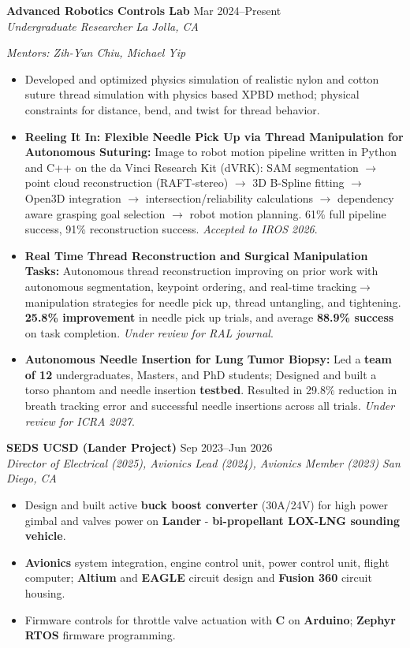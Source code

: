 \documentclass[11pt,a4paper]{article}
\newcommand{\resumeHeading}[4]{
  \vspace{0.15cm}
  \noindent\textbf{#1} \hfill #2 \\
  \noindent\textit{#3} \hfill \textit{#4} \par\vspace{0.1cm}
}
\begin{document}
\resumeHeading{Advanced Robotics Controls Lab}{Mar 2024--Present}{Undergraduate Researcher}{La Jolla, CA}
\vspace{-0.1cm}
\textit{\small Mentors: Zih-Yun Chiu, Michael Yip}
\begin{itemize}[leftmargin=0.2in, itemsep=2pt, parsep=0pt, topsep=4pt]
    \item Developed and optimized physics simulation of realistic nylon and cotton suture thread simulation with physics based XPBD method; physical constraints for distance, bend, and twist for thread behavior.
    \item \textbf{Reeling It In: Flexible Needle Pick Up via Thread Manipulation for Autonomous Suturing:} Image to robot motion pipeline written in Python and C++ on the da Vinci Research Kit (dVRK): SAM segmentation $\rightarrow$ point cloud reconstruction (RAFT-stereo) $\rightarrow$ 3D B-Spline fitting $\rightarrow$ Open3D integration $\rightarrow$ intersection/reliability calculations $\rightarrow$ dependency aware grasping goal selection $\rightarrow$ robot motion planning. 61\% full pipeline success, 91\% reconstruction success. \textit{Accepted to IROS 2026}.
    \item \textbf{Real Time Thread Reconstruction and Surgical Manipulation Tasks:} Autonomous thread reconstruction improving on prior work with autonomous segmentation, keypoint ordering, and real-time tracking$\rightarrow$manipulation strategies for needle pick up, thread untangling, and tightening. \textbf{25.8\% improvement} in needle pick up trials, and average \textbf{88.9\% success} on task completion. \textit{Under review for RAL journal}.
    \item \textbf{Autonomous Needle Insertion for Lung Tumor Biopsy:} Led a \textbf{team of 12} undergraduates, Masters, and PhD students; Designed and built a torso phantom and needle insertion \textbf{testbed}. Resulted in 29.8\% reduction in breath tracking error and successful needle insertions across all trials. \textit{Under review for ICRA 2027}.
\end{itemize}

\resumeHeading{SEDS UCSD (Lander Project)}{Sep 2023--Jun 2026}{Director of Electrical (2025), Avionics Lead (2024), Avionics Member (2023)}{San Diego, CA}
\begin{itemize}[leftmargin=0.2in, itemsep=2pt, parsep=0pt, topsep=2pt]
    \item Design and built active \textbf{buck boost converter} (30A/24V) for high power gimbal and valves power on \textbf{Lander} - \textbf{bi-propellant LOX-LNG sounding vehicle}.
    \item \textbf{Avionics} system integration, engine control unit, power control unit, flight computer; \textbf{Altium} and \textbf{EAGLE} circuit design and \textbf{Fusion 360} circuit housing.
    \item Firmware controls for throttle valve actuation with \textbf{C} on \textbf{Arduino}; \textbf{Zephyr RTOS} firmware programming.
\end{itemize}
\end{document}
